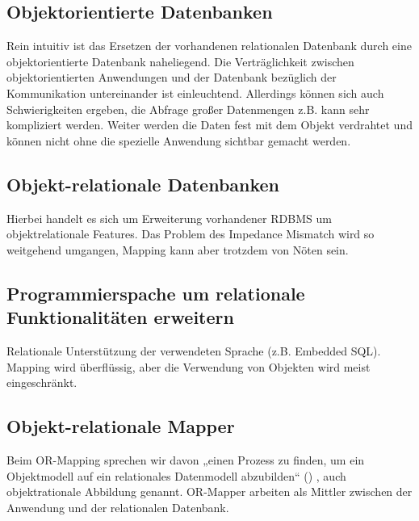 \subsection{Objektorientierte Datenbanken}

Rein intuitiv ist das Ersetzen der vorhandenen relationalen Datenbank durch eine objektorientierte Datenbank naheliegend. Die Verträglichkeit zwischen objektorientierten Anwendungen und der Datenbank bezüglich der Kommunikation untereinander ist einleuchtend. Allerdings können sich auch Schwierigkeiten ergeben, die Abfrage großer Datenmengen z.B. kann sehr kompliziert werden. Weiter werden die Daten fest mit dem Objekt verdrahtet und können nicht ohne die spezielle Anwendung sichtbar gemacht werden. 

\subsection{Objekt-relationale Datenbanken}

Hierbei handelt es sich um Erweiterung vorhandener RDBMS um objektrelationale Features. Das Problem des Impedance Mismatch wird so weitgehend umgangen, Mapping kann aber trotzdem von Nöten sein.

\subsection{Programmierspache um relationale Funktionalitäten erweitern}

Relationale Unterstützung der verwendeten Sprache (z.B. Embedded SQL). Mapping wird überflüssig, aber die Verwendung von Objekten wird meist eingeschränkt.

\subsection{Objekt-relationale Mapper}

Beim OR-Mapping sprechen wir davon „einen Prozess zu finden, um ein Objektmodell auf ein relationales Datenmodell abzubilden“  (\cite[S. 280]{Piep1})  , auch objektrationale Abbildung genannt. OR-Mapper arbeiten als Mittler zwischen der Anwendung und der relationalen Datenbank.
